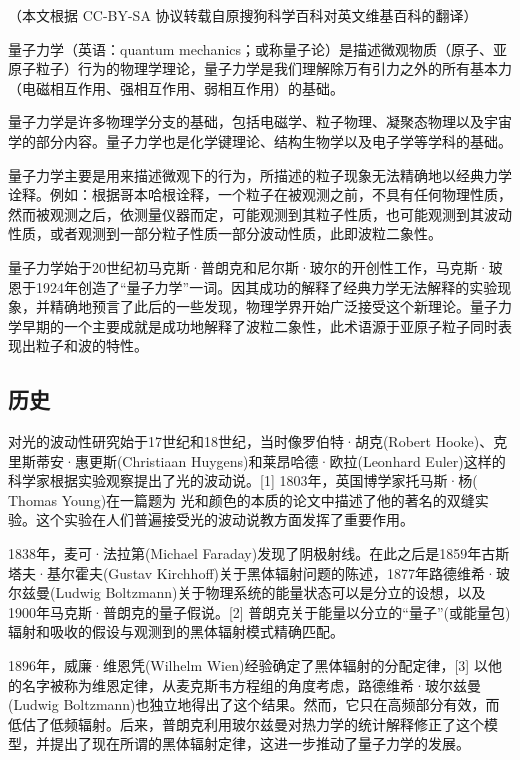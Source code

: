 
（本文根据 CC-BY-SA 协议转载自原搜狗科学百科对英文维基百科的翻译）

量子力学（英语：quantum mechanics；或称量子论）是描述微观物质（原子、亚原子粒子）行为的物理学理论，量子力学是我们理解除万有引力之外的所有基本力（电磁相互作用、强相互作用、弱相互作用）的基础。

量子力学是许多物理学分支的基础，包括电磁学、粒子物理、凝聚态物理以及宇宙学的部分内容。量子力学也是化学键理论、结构生物学以及电子学等学科的基础。

量子力学主要是用来描述微观下的行为，所描述的粒子现象无法精确地以经典力学诠释。例如：根据哥本哈根诠释，一个粒子在被观测之前，不具有任何物理性质，然而被观测之后，依测量仪器而定，可能观测到其粒子性质，也可能观测到其波动性质，或者观测到一部分粒子性质一部分波动性质，此即波粒二象性。

量子力学始于20世纪初马克斯·普朗克和尼尔斯·玻尔的开创性工作，马克斯·玻恩于1924年创造了“量子力学”一词。因其成功的解释了经典力学无法解释的实验现象，并精确地预言了此后的一些发现，物理学界开始广泛接受这个新理论。量子力学早期的一个主要成就是成功地解释了波粒二象性，此术语源于亚原子粒子同时表现出粒子和波的特性。

\subsection{ 历史}

对光的波动性研究始于17世纪和18世纪，当时像罗伯特·胡克(Robert Hooke)、克里斯蒂安·惠更斯(Christiaan Huygens)和莱昂哈德·欧拉(Leonhard Euler)这样的科学家根据实验观察提出了光的波动说。[1] 1803年，英国博学家托马斯·杨( Thomas Young)在一篇题为 光和颜色的本质的论文中描述了他的著名的双缝实验。这个实验在人们普遍接受光的波动说教方面发挥了重要作用。

1838年，麦可·法拉第(Michael Faraday)发现了阴极射线。在此之后是1859年古斯塔夫·基尔霍夫(Gustav Kirchhoff)关于黑体辐射问题的陈述，1877年路德维希·玻尔兹曼(Ludwig Boltzmann)关于物理系统的能量状态可以是分立的设想，以及1900年马克斯·普朗克的量子假说。[2] 普朗克关于能量以分立的“量子”(或能量包)辐射和吸收的假设与观测到的黑体辐射模式精确匹配。

1896年，威廉·维恩凭(Wilhelm Wien)经验确定了黑体辐射的分配定律，[3] 以他的名字被称为维恩定律，从麦克斯韦方程组的角度考虑，路德维希·玻尔兹曼(Ludwig Boltzmann)也独立地得出了这个结果。然而，它只在高频部分有效，而低估了低频辐射。后来，普朗克利用玻尔兹曼对热力学的统计解释修正了这个模型，并提出了现在所谓的黑体辐射定律，这进一步推动了量子力学的发展。

